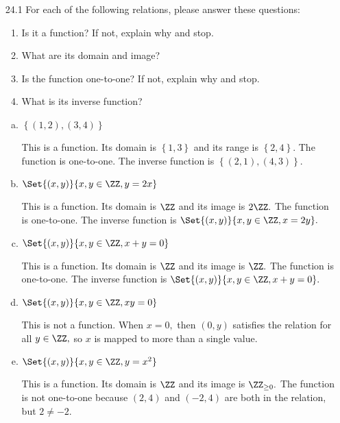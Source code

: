 \documentclass{article}
\begin{document}
\begin{itemize}
	\item[24.1] For each of the following relations, please answer these questions:
		\begin{enumerate}[(1)]
			\item Is it a function? If not, explain why and stop.
			\item What are its domain and image?
			\item Is the function one-to-one? If not, explain why and stop.
			\item What is its inverse function?
		\end{enumerate}
		\begin{enumerate}[(a)]
			\item $\left\{ (1, 2), (3, 4) \right\}$
				\begin{answer*}
					This is a function. Its domain is $\left\{ 1, 3 \right\}$ and its range is $\left\{ 2, 4 \right\}.$ The function is one-to-one. The inverse function is $\left\{ (2, 1), (4, 3) \right\}.$
				\end{answer*}

			\item $\Set{(x, y)}{x, y\in\ZZ, y=2x}$
				\begin{answer*}
					This is a function. Its domain is $\ZZ$ and its image is $2\ZZ.$ The function is one-to-one. The inverse function is $\Set{(x, y)}{x, y\in\ZZ, x=2y}.$
				\end{answer*}

			\item $\Set{(x, y)}{x, y\in \ZZ, x+y=0}$
				\begin{answer*}
					This is a function. Its domain is $\ZZ$ and its image is $\ZZ.$ The function is one-to-one. The inverse function is $\Set{(x, y)}{x, y\in \ZZ, x+y=0}.$
				\end{answer*}

			\item $\Set{(x, y)}{x, y\in\ZZ, xy=0}$
				\begin{answer*}
					This is not a function. When $x=0,$ then $(0, y)$ satisfies the relation for all $y\in\ZZ,$ so $x$ is mapped to more than a single value.
				\end{answer*}

			\item $\Set{(x, y)}{x, y\in\ZZ, y=x^2}$
				\begin{answer*}
					This is a function. Its domain is $\ZZ$ and its image is $\ZZ_{\ge0}.$ The function is not one-to-one because $(2, 4)$ and $(-2, 4)$ are both in the relation, but $2\neq -2.$
				\end{answer*}


\end{enumerate}
\end{itemize}
\end{document}
